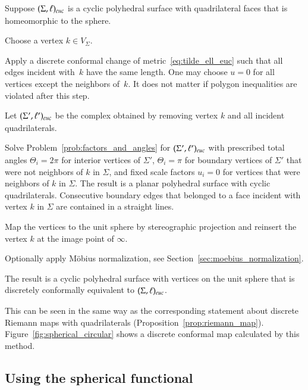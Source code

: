 \documentclass[Thesis]{subfiles}
\begin{document}
Suppose $(\Sigma,\ell)_{\euc}$ is a cyclic polyhedral surface with
quadrilateral faces that is homeomorphic to the sphere.
\begin{compactenum}[(1)]
\item Choose a vertex $k\in V_{\Sigma}$.
\item Apply a discrete conformal change of
  metric~\eqref{eq:tilde_ell_euc} such that all edges incident
  with~$k$ have the same length. One may choose $u=0$ for all
  vertices except the neighbors of~$k$. It does not matter if polygon
  inequalities are violated after this step. 
\item Let $(\Sigma',\ell')_{\euc}$ be the complex obtained by removing
  vertex $k$ and all incident quadrilaterals.
\item Solve Problem~\ref{prob:factors_and_angles} for
  $(\Sigma',\ell')_{\euc}$ with prescribed total angles
  $\Theta_i=2\pi$ for interior vertices of $\Sigma'$, $\Theta_i=\pi$
  for boundary vertices of $\Sigma'$ that were not neighbors of $k$ in
  $\Sigma$, and fixed scale factors $u_i=0$ for vertices that were
  neighbors of $k$ in $\Sigma$.  The result is a planar polyhedral
  surface with cyclic quadrilaterals. Consecutive boundary edges
  that belonged to a face incident with vertex $k$ in $\Sigma$ are
  contained in a straight lines.
\item Map the vertices to the unit sphere by stereographic projection
  and reinsert the vertex $k$ at the image point of $\infty$.
\item Optionally apply M{\"o}bius normalization, see Section~\ref{sec:moebius_normalization}. 
\end{compactenum} 

\begin{proposition}
  The result is a cyclic polyhedral surface with vertices on the unit
  sphere that is discretely conformally equivalent to $(\Sigma,
  \ell)_{\euc}$.
\end{proposition}

This can be seen in the same way as the corresponding statement about
discrete Riemann maps with quadrilaterals
(Proposition~\ref{prop:riemann_map}). Figure~\ref{fig:spherical_circular}
shows a discrete conformal map  calculated by this method.


\subsection{Using the spherical functional}
\label{sec:spherical_computation}
\end{document}
